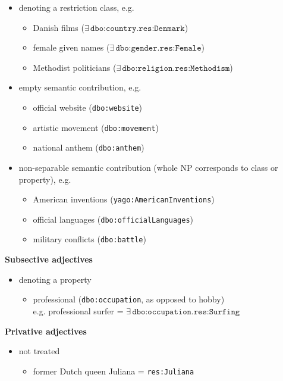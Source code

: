 \documentclass[11pt]{article}
\begin{document}
\begin{itemize}
\item denoting a restriction class, e.g.
 \begin{itemize}
 \item Danish films ($\exists\,\texttt{dbo:country}.\texttt{res:Denmark}$)
 \item female given names ($\exists\,\texttt{dbo:gender}.\texttt{res:Female}$)
 \item Methodist politicians ($\exists\,\texttt{dbo:religion}.\texttt{res:Methodism}$)
 \end{itemize}

\item empty semantic contribution, e.g.
 \begin{itemize}
 \item official website (\texttt{dbo:website})
 \item artistic movement (\texttt{dbo:movement})
 \item national anthem (\texttt{dbo:anthem})
 \end{itemize}

\item non-separable semantic contribution (whole NP corresponds to class or property), e.g.
 \begin{itemize}
 \item American inventions (\texttt{yago:AmericanInventions})
 \item official languages (\texttt{dbo:officialLanguages})
 \item military conflicts (\texttt{dbo:battle})
 \end{itemize}
\end{itemize}


\textbf{Subsective adjectives}

\begin{itemize}
\item denoting a property
 \begin{itemize}
 \item professional (\texttt{dbo:occupation}, as opposed to hobby)\\
       e.g. professional surfer = $\exists\,\texttt{dbo:occupation}.\texttt{res:Surfing}$
 \end{itemize}
\end{itemize}

\textbf{Privative adjectives}

\begin{itemize}
\item not treated 
 \begin{itemize}
 \item former Dutch queen Juliana = \texttt{res:Juliana}
 \end{itemize}
\end{itemize}
\end{document}
